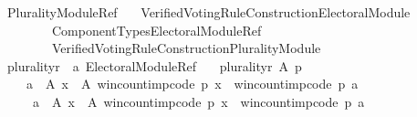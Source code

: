 %
\begin{isabellebody}%
%
%
\isadelimtheory
%
\endisadelimtheory
%
\isatagtheory
{}\isamarkupfalse%
\ Plurality{\isacharunderscore}{\kern0pt}Module{\isacharunderscore}{\kern0pt}Ref\isanewline
\ \ \ {\isachardoublequoteopen}Verified{\isacharunderscore}{\kern0pt}Voting{\isacharunderscore}{\kern0pt}Rule{\isacharunderscore}{\kern0pt}Construction{\isachardot}{\kern0pt}Electoral{\isacharunderscore}{\kern0pt}Module{\isachardoublequoteclose}\isanewline
\ \ \ \ \ \ \ \ {\isachardoublequoteopen}Component{\isacharunderscore}{\kern0pt}Types{\isacharslash}{\kern0pt}Electoral{\isacharunderscore}{\kern0pt}Module{\isacharunderscore}{\kern0pt}Ref{\isachardoublequoteclose}\isanewline
\ \ \ \ \ \ \ \ {\isachardoublequoteopen}Verified{\isacharunderscore}{\kern0pt}Voting{\isacharunderscore}{\kern0pt}Rule{\isacharunderscore}{\kern0pt}Construction{\isachardot}{\kern0pt}Plurality{\isacharunderscore}{\kern0pt}Module{\isachardoublequoteclose}\isanewline
{}%
\endisatagtheory
{\isafoldtheory}%
%
\isadelimtheory
\isanewline
%
\endisadelimtheory
\isanewline
\isanewline
{}\isamarkupfalse%
\ plurality{\isacharunderscore}{\kern0pt}r\ {\isacharcolon}{\kern0pt}{\isacharcolon}{\kern0pt}\ {\isachardoublequoteopen}{\isacharprime}{\kern0pt}a\ Electoral{\isacharunderscore}{\kern0pt}Module{\isacharunderscore}{\kern0pt}Ref{\isachardoublequoteclose}\ \isanewline
\ \ {\isachardoublequoteopen}plurality{\isacharunderscore}{\kern0pt}r\ A\ p\ {\isacharequal}{\kern0pt}\isanewline
\ \ \ \ {\isacharparenleft}{\kern0pt}{\isacharbraceleft}{\kern0pt}a\ {\isasymin}\ A{\isachardot}{\kern0pt}\ {\isasymforall}x\ {\isasymin}\ A{\isachardot}{\kern0pt}\ win{\isacharunderscore}{\kern0pt}count{\isacharunderscore}{\kern0pt}imp{\isacharunderscore}{\kern0pt}code\ p\ x\ {\isasymle}\ win{\isacharunderscore}{\kern0pt}count{\isacharunderscore}{\kern0pt}imp{\isacharunderscore}{\kern0pt}code\ p\ a{\isacharbraceright}{\kern0pt}{\isacharcomma}{\kern0pt}\isanewline
\ \ \ \ \ {\isacharbraceleft}{\kern0pt}a\ {\isasymin}\ A{\isachardot}{\kern0pt}\ {\isasymexists}x\ {\isasymin}\ A{\isachardot}{\kern0pt}\ win{\isacharunderscore}{\kern0pt}count{\isacharunderscore}{\kern0pt}imp{\isacharunderscore}{\kern0pt}code\ p\ x\ {\isachargreater}{\kern0pt}\ win{\isacharunderscore}{\kern0pt}count{\isacharunderscore}{\kern0pt}imp{\isacharunderscore}{\kern0pt}code\ p\ a{\isacharbraceright}{\kern0pt}{\isacharcomma}{\kern0pt}\isanewline

\end{isabellebody}
